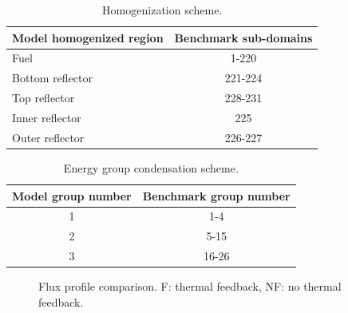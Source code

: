 \begin{table}[htbp!]
\centering
      \caption{Homogenization scheme.}
      \label{tab:coupled-rz}
    \begin{tabular}{l c}
  \toprule
  Model homogenized region & Benchmark sub-domains \\
  \midrule
  Fuel               & 1-220   \\
  Bottom reflector   & 221-224 \\
  Top reflector      & 228-231 \\
  Inner reflector    & 225     \\
  Outer reflector    & 226-227 \\
  \bottomrule
  \end{tabular}
\end{table}

\begin{table}[htbp!]
\centering
      \caption{Energy group condensation scheme.}
      \label{tab:coupled-eg}
    \begin{tabular}{c c}
  \toprule
  Model group number & Benchmark group number \\
  \midrule
  1 & 1-4   \\
  2 & 5-15  \\
  3 & 16-26 \\
  \bottomrule
  \end{tabular}
\end{table}

\begin{figure}[htbp!]
  \centering
  \hfill
  \caption{Flux profile comparison. F: thermal feedback, NF: no thermal feedback.}
  \label{fig:coupled-results-flux}
\end{figure}

